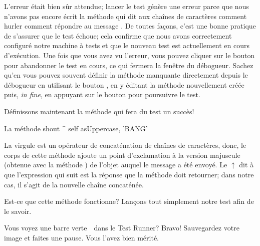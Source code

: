 \documentclass[a4paper,10pt,twoside]{book}
\begin{document}
L'erreur était bien sûr attendue; lancer le test génère une
erreur parce que nous n'avons pas encore écrit la méthode qui dit
aux chaînes de caractères comment hurler 
\cad comment répondre au message \mbox{.}
De toutes façons, c'est une bonne pratique de s'assurer que le test
échoue; cela confirme que nous avons correctement
configuré notre machine à tests %
et que le nouveau test est actuellement en cours d'exécution.
Une fois que vous avez vu l'erreur, vous pouvez cliquer sur le bouton
 pour abandonner le test en cours, ce qui fermera la
fenêtre du débogueur.
Sachez qu'en \st vous pouvez souvent définir la méthode manquante
directement depuis le débogueur 
en utilisant le bouton , en y éditant la méthode
nouvellement créée puis, \emph{in fine}, en appuyant sur le bouton
 pour poursuivre le test.

Définissons maintenant la méthode qui fera du test un succès!

\begin{method}[shout]{La méthode }
shout
	^ self asUppercase, 'BANG'
\end{method}

La virgule est un opérateur de concaténation de chaînes de
caractères, donc, le corps de cette méthode ajoute un point
d'exclamation à la version majuscule
(obtenue avec la méthode )
de l'objet  auquel le message  a été
envoyé.
Le $\uparrow$ dit à \pharo que l'expression qui suit est la réponse
que la méthode doit retourner; dans notre cas, il s'agit de la
nouvelle chaîne concaténée.

Est-ce que cette méthode fonctionne? Lançons tout simplement
notre test afin de le savoir.

Vous voyez une barre verte~\footnotemark\ dans le Test Runner? Bravo!
Sauvegardez votre image et faites une pause. 
Vous l'avez bien mérité. 
\end{document}
